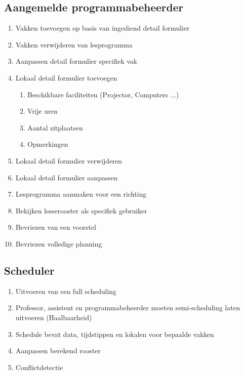 \subsection{Aangemelde programmabeheerder}
\begin{enumerate}
    \item Vakken toevoegen op basis van ingediend detail formulier
    \item Vakken verwijderen van lesprogramma
    \item Aanpassen detail formulier specifiek vak
    \item Lokaal detail formulier toevoegen
    \begin{enumerate}
        \item Beschikbare faciliteiten (Projector, Computers ...)
        \item Vrije uren
        \item Aantal zitplaatsen
        \item Opmerkingen
    \end{enumerate}
    \item Lokaal detail formulier verwijderen
    \item Lokaal detail formulier aanpassen
    \item Lesprogramma aanmaken voor een richting
    \item Bekijken lesserooster als specifiek gebruiker
    \item Bevriezen van een voorstel
    \item Bevriezen volledige planning
\end{enumerate}

\subsection{Scheduler}
\begin{enumerate}
    \item Uitvoeren van een full scheduling
    \item Professor, assistent en programmabeheerder moeten semi-scheduling laten uitvoeren (Haalbaarheid) 
    \item Schedule bevat data, tijdstippen en lokalen voor bepaalde vakken
    \item Aanpassen berekend rooster
    \item Conflictdetectie
\end{enumerate}